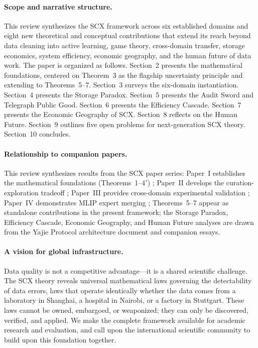 \documentclass[twocolumn]{article}
\theoremstyle{definition}
\begin{document}
\paragraph{Scope and narrative structure.}
This review synthesizes the SCX framework across six established domains and eight new theoretical and conceptual contributions that extend its reach beyond data cleaning into active learning, game theory, cross-domain transfer, storage economics, system efficiency, economic geography, and the human future of data work. The paper is organized as follows. Section~2 presents the mathematical foundations, centered on Theorem~3 as the flagship uncertainty principle and extending to Theorems~5--7. Section~3 surveys the six-domain instantiation. Section~4 presents the Storage Paradox. Section~5 presents the Audit Sword and Telegraph Public Good. Section~6 presents the Efficiency Cascade. Section~7 presents the Economic Geography of SCX. Section~8 reflects on the Human Future. Section~9 outlines five open problems for next-generation SCX theory. Section~10 concludes.

\paragraph{Relationship to companion papers.}
This review synthesizes results from the SCX paper series: Paper~I establishes the mathematical foundations (Theorems~1--4$'$) \cite{paperI}; Paper~II develops the curation-exploration tradeoff \cite{paperII}; Paper~III provides cross-domain experimental validation \cite{paperIII}; Paper~IV demonstrates MLIP expert merging \cite{paperIV}; Theorems~5--7 appear as standalone contributions in the present framework; the Storage Paradox, Efficiency Cascade, Economic Geography, and Human Future analyses are drawn from the Yajie Protocol architecture document and companion essays.

\paragraph{A vision for global infrastructure.}
Data quality is not a competitive advantage---it is a shared scientific challenge. The SCX theory reveals universal mathematical laws governing the detectability of data errors, laws that operate identically whether the data comes from a laboratory in Shanghai, a hospital in Nairobi, or a factory in Stuttgart. These laws cannot be owned, embargoed, or weaponized; they can only be discovered, verified, and applied. We make the complete framework available for academic research and evaluation, and call upon the international scientific community to build upon this foundation together.
\end{document}
